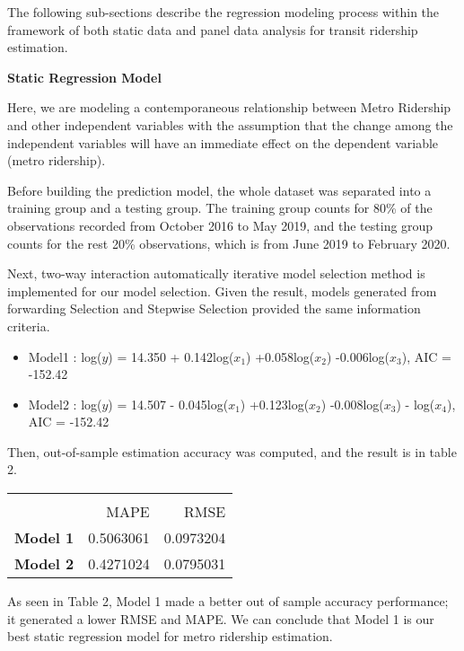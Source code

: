 \documentclass[]{article}
\providecommand{\tightlist}{%
  \setlength{\itemsep}{0pt}\setlength{\parskip}{0pt}}
\begin{document}
The following sub-sections describe the regression modeling process
within the framework of both static data and panel data analysis for
transit ridership estimation.

\textbf{Static Regression Model}

Here, we are modeling a contemporaneous relationship between Metro
Ridership and other independent variables with the assumption that the
change among the independent variables will have an immediate effect on
the dependent variable (metro ridership).

Before building the prediction model, the whole dataset was separated
into a training group and a testing group. The training group counts for
80\% of the observations recorded from October 2016 to May 2019, and the
testing group counts for the rest 20\% observations, which is from June
2019 to February 2020.

Next, two-way interaction automatically iterative model selection method
is implemented for our model selection. Given the result, models
generated from forwarding Selection and Stepwise Selection provided the
same information criteria.

\begin{itemize}
\tightlist
\item
  Model1 : log(\(y\)) = 14.350 + 0.142log(\({x_1}\))
  +0.058log(\({x_2}\)) -0.006log(\({x_3}\)), AIC = -152.42
\item
  Model2 : log(\(y\)) = 14.507 - 0.045log(\({x_1}\))
  +0.123log(\({x_2}\)) -0.008log(\({x_3}\)) - log(\({x_4}\)), AIC =
  -152.42
\end{itemize}

Then, out-of-sample estimation accuracy was computed, and the result is
in table 2.

\begin{table}[H]
\centering
\begin{tabular}{>{\bfseries}l||r|r}
\hline
\multicolumn{3}{c|}{Table 2: Out of Sample Prediction Accuracy  } \\
\cline{1-3}
  & MAPE & RMSE\\
\hline
Model 1 & 0.5063061 & 0.0973204\\
\hline
Model 2 & 0.4271024 & 0.0795031\\
\hline
\end{tabular}
\end{table}

As seen in Table 2, Model 1 made a better out of sample accuracy
performance; it generated a lower RMSE and MAPE. We can conclude that
Model 1 is our best static regression model for metro ridership
estimation.
\end{document}
